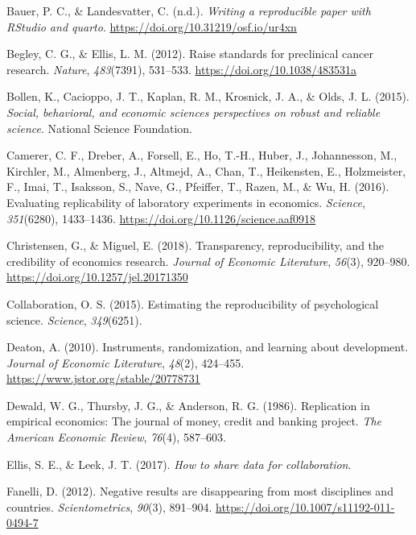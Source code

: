 \documentclass[
  a4paper,
]{article}
\newlength{\cslhangindent}
\newenvironment{CSLReferences}[2] %
 {\begin{list}{}{%
  \setlength{\itemindent}{0pt}
  \setlength{\leftmargin}{0pt}
  \setlength{\parsep}{0pt}
  \ifodd #1
   \setlength{\leftmargin}{\cslhangindent}
   \setlength{\itemindent}{-1\cslhangindent}
  \fi
  \setlength{\itemsep}{#2\baselineskip}}}
 {\end{list}}
\begin{document}
\label{refs}
\begin{CSLReferences}{1}{0}
Bauer, P. C., \& Landesvatter, C. (n.d.). \emph{Writing a reproducible
paper with RStudio and quarto}.
\url{https://doi.org/10.31219/osf.io/ur4xn}

Begley, C. G., \& Ellis, L. M. (2012). Raise standards for preclinical
cancer research. \emph{Nature}, \emph{483}(7391), 531--533.
\url{https://doi.org/10.1038/483531a}

Bollen, K., Cacioppo, J. T., Kaplan, R. M., Krosnick, J. A., \& Olds, J.
L. (2015). \emph{Social, behavioral, and economic sciences perspectives
on robust and reliable science}. National Science Foundation.

Camerer, C. F., Dreber, A., Forsell, E., Ho, T.-H., Huber, J.,
Johannesson, M., Kirchler, M., Almenberg, J., Altmejd, A., Chan, T.,
Heikensten, E., Holzmeister, F., Imai, T., Isaksson, S., Nave, G.,
Pfeiffer, T., Razen, M., \& Wu, H. (2016). Evaluating replicability of
laboratory experiments in economics. \emph{Science}, \emph{351}(6280),
1433--1436. \url{https://doi.org/10.1126/science.aaf0918}

Christensen, G., \& Miguel, E. (2018). Transparency, reproducibility,
and the credibility of economics research. \emph{Journal of Economic
Literature}, \emph{56}(3), 920--980.
\url{https://doi.org/10.1257/jel.20171350}

Collaboration, O. S. (2015). Estimating the reproducibility of
psychological science. \emph{Science}, \emph{349}(6251).

Deaton, A. (2010). Instruments, randomization, and learning about
development. \emph{Journal of Economic Literature}, \emph{48}(2),
424--455. \url{https://www.jstor.org/stable/20778731}

Dewald, W. G., Thursby, J. G., \& Anderson, R. G. (1986). Replication in
empirical economics: The journal of money, credit and banking project.
\emph{The American Economic Review}, \emph{76}(4), 587--603.

Ellis, S. E., \& Leek, J. T. (2017). \emph{How to share data for
collaboration}.

Fanelli, D. (2012). Negative results are disappearing from most
disciplines and countries. \emph{Scientometrics}, \emph{90}(3),
891--904. \url{https://doi.org/10.1007/s11192-011-0494-7}


\end{CSLReferences}
\end{document}
